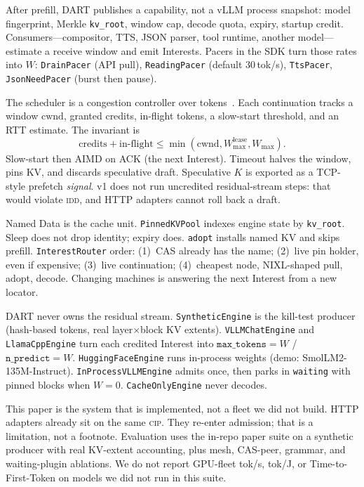 \documentclass{article}
\theoremstyle{definition}
\newcommand{\cip}{\textsc{cip}}
\newcommand{\idd}{\textsc{idd}}
\newcommand{\kvroot}{\texttt{kv\_root}}
\newcommand{\cwnd}{\mathrm{cwnd}}
\begin{document}
After prefill, DART publishes a capability, not a vLLM process snapshot: model fingerprint, Merkle \kvroot{}, window cap, decode quota, expiry, startup credit.
Consumers---compositor, TTS, JSON parser, tool runtime, another model---estimate a receive window and emit Interests.
Pacers in the SDK turn those rates into $W$: \texttt{DrainPacer} (API pull), \texttt{ReadingPacer} (default 30\,tok/s), \texttt{TtsPacer}, \texttt{JsonNeedPacer} (burst then pause).

The scheduler is a congestion controller over tokens~\citep{jacobson1988congestion}.
Each continuation tracks a window $\cwnd$, granted credits, in-flight tokens, a slow-start threshold, and an RTT estimate.
The invariant is
\begin{equation}
\mathrm{credits} + \mathrm{in\textrm{-}flight} \le \min(\cwnd, W_{\max}^{\mathrm{lease}}, W_{\max}).
\label{eq:inv}
\end{equation}
Slow-start then AIMD on ACK (the next Interest).
Timeout halves the window, pins KV, and discards speculative draft.
Speculative $K$ is exported as a TCP-style prefetch \emph{signal}.
v1 does not run uncredited residual-stream steps: that would violate \idd{}, and HTTP adapters cannot roll back a draft.

Named Data is the cache unit.
\texttt{PinnedKVPool} indexes engine state by \kvroot{}.
Sleep does not drop identity; expiry does.
\texttt{adopt} installs named KV and skips prefill.
\texttt{InterestRouter} order: (1)~CAS already has the name; (2)~live pin holder, even if expensive; (3)~live continuation; (4)~cheapest node, NIXL-shaped pull, adopt, decode.
Changing machines is answering the next Interest from a new locator.

DART never owns the residual stream.
\texttt{SyntheticEngine} is the kill-test producer (hash-based tokens, real layer$\times$block KV extents).
\texttt{VLLMChatEngine} and \texttt{LlamaCppEngine} turn each credited Interest into $\texttt{max\_tokens}{=}W$ / $\texttt{n\_predict}{=}W$.
\texttt{HuggingFaceEngine} runs in-process weights (demo: SmolLM2-135M-Instruct).
\texttt{InProcessVLLMEngine} admits once, then parks in \texttt{waiting} with pinned blocks when $W{=}0$.
\texttt{CacheOnlyEngine} never decodes.

This paper is the system that is implemented, not a fleet we did not build.
HTTP adapters already sit on the same \cip{}.
They re-enter admission; that is a limitation, not a footnote.
Evaluation uses the in-repo paper suite on a synthetic producer with real KV-extent accounting, plus mesh, CAS-peer, grammar, and waiting-plugin ablations.
We do not report GPU-fleet tok/s, tok/J, or Time-to-First-Token on models we did not run in this suite.
\end{document}
